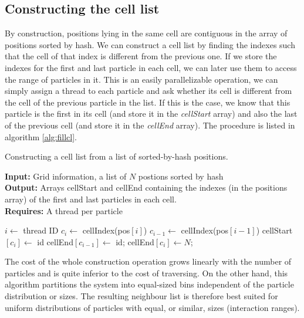 \documentclass[ twoside,openright,titlepage,numbers=noenddot,%
headinclude,footinclude,cleardoublepage=empty,abstract=on,
BCOR=5mm,paper=b5,fontsize=11pt, dvipsnames
]{scrreprt}
\begin{document}
\subsection*{Constructing the cell list}
By construction, positions lying in the same cell are contiguous in the array of positions sorted by hash. We can construct a cell list by finding the indexes such that the cell of that index is different from the previous one. If we store the indexes for the first and last particle in each cell, we can later use them to access the range of particles in it.
This is an easily parallelizable operation, we can simply assign a thread to each particle and ask whether its cell is different from the cell of the previous particle in the list. If this is the case, we know that this particle is the first in its cell (and store it in the \emph{cellStart} array) and also the last of the previous cell (and store it in the \emph{cellEnd} array). The procedure is listed in algorithm \ref{alg:fillcl}.
\begin{algorithm}
  \caption{Constructing a cell list from a list of sorted-by-hash positions.} \label{alg:fillcl}
  \textbf{Input:} Grid information, a list of $N$ postions sorted by hash\\
  \textbf{Output:} Arrays cellStart and cellEnd containing the indexes (in the positions array) of the first and last particles in each cell.\\
  \textbf{Requires:} A thread per particle
  \begin{algorithmic}[1]
    \State $i\gets$ thread ID 
    \State $c_i\gets$ cellIndex(pos$[i]$)
    \State $c_{i-1}\gets$ cellIndex(pos$[i-1]$)
    \EndIf
    \State cellStart$[c_i]\gets$ id
    \State cellEnd$[c_{i-1}]\gets$ id;
    \EndIf
    \EndIf
    \State cellEnd$[c_i]\gets N$;
    \EndIf
  \end{algorithmic}
\end{algorithm}

The cost of the whole construction operation grows linearly with the number of particles and is quite inferior to the cost of traversing. On the other hand, this algorithm partitions the system into equal-sized bins independent of the particle distribution or sizes. The resulting neighbour list is therefore best suited for uniform distributions of particles with equal, or similar, sizes (interaction ranges).
\end{document}
